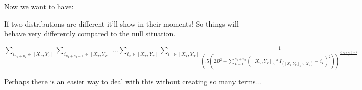 \documentclass[11pt]{article}
\begin{document}
Now we want to have:

If two distributions are different it'll show in their moments! So things will behave very differently compared to the null situation.

$ \sum_{i_{n_1+n_2} \in [X_T, Y_T]} \sum_{i_{n_1+n_2-1}\in [X_T, Y_T]} \ldots  \sum_{i_{2}\in [X_T, Y_T]} \sum_{i_{1}\in [X_T, Y_T]} \frac{1}{(.5(2B_1^2 +  \sum_{L=1}^{n_1+n_2} ([X_V, Y_V]_{L}*I_{([X_V, Y_V]_{L} \in X_V)} - i_L)^2))^{\frac{(n_1+n_2)-1}{2}}} $

Perhaps there is an easier way to deal with this without creating so many terms...
\end{document}
